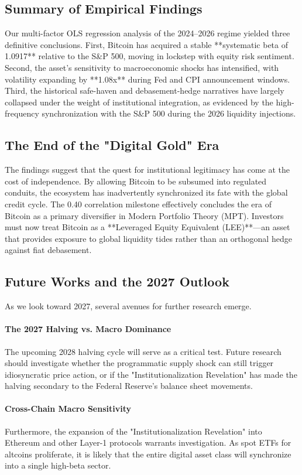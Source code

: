 \documentclass[10pt, conference, compsocconf]{IEEEtran}
\begin{document}
\subsection{Summary of Empirical Findings}
Our multi-factor OLS regression analysis of the 2024--2026 regime yielded three definitive conclusions. First, Bitcoin has acquired a stable **systematic beta of 1.0917** relative to the S\&P 500, moving in lockstep with equity risk sentiment. Second, the asset’s sensitivity to macroeconomic shocks has intensified, with volatility expanding by **1.08x** during Fed and CPI announcement windows. Third, the historical safe-haven and debasement-hedge narratives have largely collapsed under the weight of institutional integration, as evidenced by the high-frequency synchronization with the S\&P 500 during the 2026 liquidity injections.

\subsection{The End of the "Digital Gold" Era}
The findings suggest that the quest for institutional legitimacy has come at the cost of independence. By allowing Bitcoin to be subsumed into regulated conduits, the ecosystem has inadvertently synchronized its fate with the global credit cycle. The 0.40 correlation milestone effectively concludes the era of Bitcoin as a primary diversifier in Modern Portfolio Theory (MPT). Investors must now treat Bitcoin as a **Leveraged Equity Equivalent (LEE)**—an asset that provides exposure to global liquidity tides rather than an orthogonal hedge against fiat debasement.

\subsection{Future Works and the 2027 Outlook}
As we look toward 2027, several avenues for further research emerge. 

\paragraph{The 2027 Halving vs. Macro Dominance}
The upcoming 2028 halving cycle will serve as a critical test. Future research should investigate whether the programmatic supply shock can still trigger idiosyncratic price action, or if the "Institutionalization Revelation" has made the halving secondary to the Federal Reserve’s balance sheet movements.

\paragraph{Cross-Chain Macro Sensitivity}
Furthermore, the expansion of the "Institutionalization Revelation" into Ethereum and other Layer-1 protocols warrants investigation. As spot ETFs for altcoins proliferate, it is likely that the entire digital asset class will synchronize into a single high-beta sector.
\end{document}
